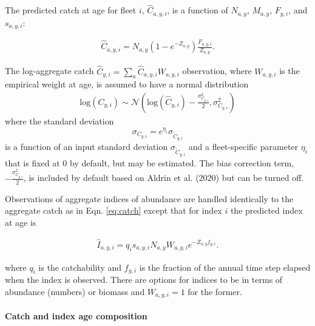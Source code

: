 \documentclass[]{article}
\let\oldparagraph\paragraph
\renewcommand{\paragraph}[1]{\oldparagraph{#1}\mbox{}}
\begin{document}
The predicted catch at age for fleet \(i\), \(\hat{C}_{a,y,i}\), is a
function of \(N_{a,y}\), \(M_{a,y}\), \(F_{y,i}\), and \(s_{a,y,i}\):

\begin{equation}
\label{eq:predcatch}
  \begin{array}{ccc}
    \hat{C}_{a,y,i} = N_{a,y} \left(1- e^{-Z_{a,y}}\right)\frac{F_{a,y,i}}{Z_{a,y}}.
  \end{array}
\end{equation}

The log-aggregate catch
\(\hat{C}_{y,i} = \sum_a \hat{C}_{a,y,i}W_{a,y,i}\) observation, where
\(W_{a,y,i}\) is the empirical weight at age, is assumed to have a
normal distribution \begin{equation}
\label{eq:catch}
  \begin{array}{ccc}
    \text{log}(C_{y,i}) \sim \mathcal{N}\left( \text{log}(\hat{C}_{y,i}) - \frac{\sigma^2_{C_{y,i}}}{2}, \sigma^2_{C_{y,i}}\right)
  \end{array}
\end{equation} where the standard deviation \[
\sigma_{C_{y,i}} = e^{\eta_i}\sigma_{\tilde{C}_{y,i}}
\] is a function of an input standard deviation
\(\sigma_{\tilde{C}_{y,i}}\) and a fleet-specific parameter \(\eta_i\)
that is fixed at 0 by default, but may be estimated. The bias correction
term, \(- \frac{\sigma^2_{C_{y,i}}}{2}\), is included by default based
on Aldrin et al. (2020) but can be turned off.

Observations of aggregate indices of abundance are handled identically
to the aggregate catch as in Eqn. \ref{eq:catch} except that for index
\(i\) the predicted index at age is

\begin{equation}
\label{eq:predindex}
  \begin{array}{c}
    \hat{I}_{a,y,i} = q_i s_{a,y,i} N_{a,y}W_{a,y,i} e^{-Z_{a,y}f_{y,i}}.
  \end{array}
\end{equation}

where \(q_i\) is the catchability and \(f_{y,i}\) is the fraction of the
annual time step elapsed when the index is observed. There are options
for indices to be in terms of abundance (numbers) or biomass and
\(W_{a,y,i} = 1\) for the former.

\hypertarget{catch-and-index-age-composition}{%
\paragraph{Catch and index age
composition}\label{catch-and-index-age-composition}}
\end{document}
